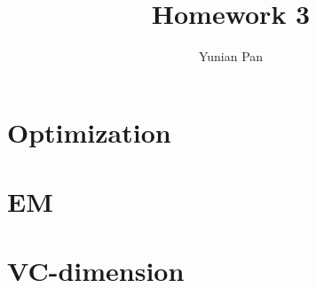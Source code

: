 \documentclass[a4paper,12pt]{article}
\begin{document}
\title{\textbf{Homework 3}}
\author{Yunian Pan}
\maketitle{}


\section{Optimization}



\section{EM}



\section{VC-dimension}
\end{document}
